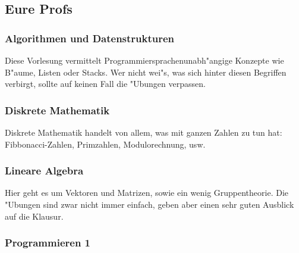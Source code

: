 \subsection{Eure Profs}

\subsubsection{Algorithmen und Datenstrukturen}

Diese Vorlesung vermittelt Programmiersprachenunabh"angige Konzepte wie B"aume, Listen oder Stacks. Wer nicht wei"s, was sich hinter diesen Begriffen verbirgt, sollte auf keinen Fall die "Ubungen verpassen.


\subsubsection{Diskrete Mathematik}

Diskrete Mathematik handelt von allem, was mit ganzen Zahlen zu tun hat: Fibbonacci-Zahlen, Primzahlen, Modulorechnung, usw.


\subsubsection{Lineare Algebra}

Hier geht es um Vektoren und Matrizen, sowie ein wenig Gruppentheorie. Die
"Ubungen sind zwar nicht immer einfach, geben aber einen sehr guten Ausblick auf die Klausur.


\subsubsection{Programmieren 1}

